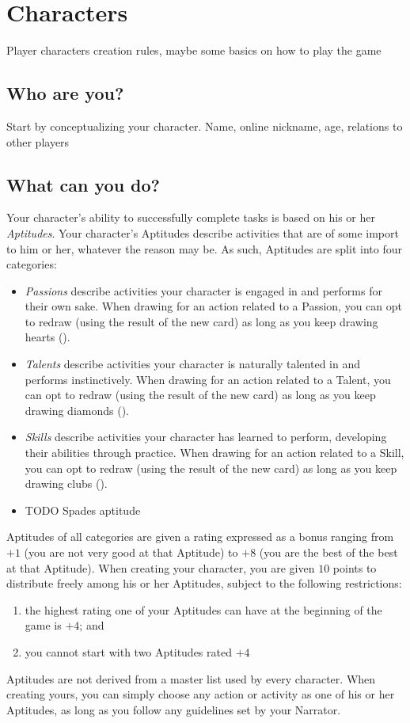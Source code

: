 \chapter{Characters}

Player characters creation rules, maybe some basics on how to play the game

\section{Who are you?}

Start by conceptualizing your character.
Name, online nickname, age, relations to other players

\section{What can you do?}

Your character's ability to successfully complete tasks is based on his or her \emph{Aptitudes}.
Your character's Aptitudes describe activities that are of some import to him or her, whatever the
reason may be. As such, Aptitudes are split into four categories:
\begin{itemize}
\item \emph{Passions} describe activities your character is engaged in and performs for their own sake.
When drawing for an action related to a Passion, you can opt to redraw (using the result of the new card)
as long as you keep drawing hearts (\heart).

\item \emph{Talents} describe activities your character is naturally talented in and performs instinctively.
When drawing for an action related to a Talent, you can opt to redraw (using the result of the new card)
as long as you keep drawing diamonds (\diamond).

\item \emph{Skills} describe activities your character has learned to perform, developing their abilities
through practice. When drawing for an action related to a Skill, you can opt to redraw (using the result of the new card) as long as you keep drawing clubs (\club).

\item TODO Spades aptitude
\end{itemize}

Aptitudes of all categories are given a rating expressed as a bonus ranging from $+1$ (you are not very good
at that Aptitude) to $+8$ (you are the best of the best at that Aptitude). When creating your character, you
are given $10$ points to distribute freely among his or her Aptitudes, subject to the following restrictions:
\begin{enumerate}
\item the highest rating one of your Aptitudes can have at the beginning of the game is $+4$; and
\item you cannot start with two Aptitudes rated $+4$
\end{enumerate}

Aptitudes are not derived from a master list used by every character. When creating yours, you can simply
choose any action or activity as one of his or her Aptitudes, as long as you follow any guidelines set by
your Narrator.
